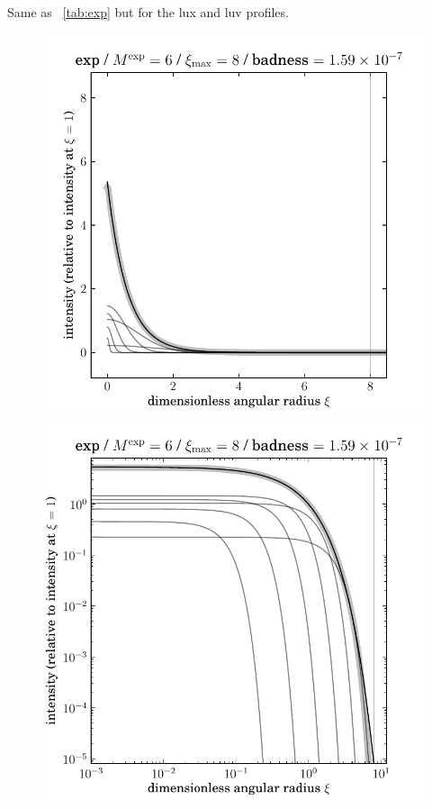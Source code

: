 \documentclass[12pt,pdftex,preprint]{aastex}
\newlength{\figurewidth}
\begin{document}
\clearpage
\begin{table}
\\
\vspace{2ex}\\

\caption{Same as \tablename~\ref{tab:exp} but for the lux and luv
  profiles.\label{tab:lux}}
\end{table}

\clearpage
\begin{figure}
\includegraphics[width=\figurewidth]{exp_K06_MR08_profile.pdf}%
\includegraphics[width=\figurewidth]{exp_K06_MR08_profile_log.pdf}\\

\end{figure}
\end{document}
